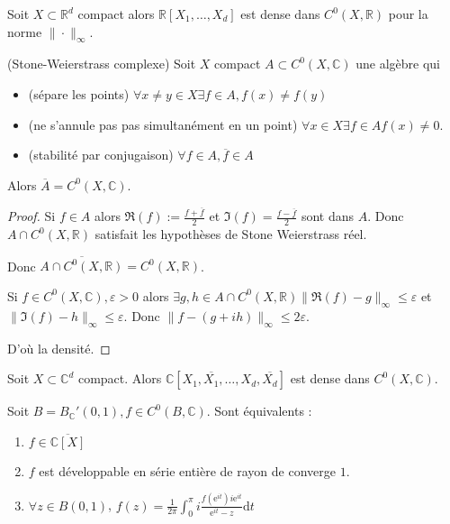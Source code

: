 \begin{corollaire}
	Soit $X\subset \mathbb{R}^d $ compact alors $\mathbb{R}[X_1,\ldots,X_d]$ est dense dans $C^0\left(X,\mathbb{R}\right)  $ pour la norme $\|\cdot \|_\infty$.
\end{corollaire}

\begin{corollaire}
	(Stone-Weierstrass complexe)
	Soit $X$ compact $A \subset C^0\left(X,\mathbb{C} \right)  $ une algèbre qui 
	\begin{itemize}
		\item (sépare les points) $\forall x \neq y \in X \exists f \in A, f(x) \neq f(y)$
		\item (ne s'annule pas pas simultanément en un point) $\forall x \in X \exists f \in A f\left( x \right) \neq 0$.
		\item (stabilité par conjugaison) $\forall f \in A, \overline{f} \in A $
	\end{itemize}
	Alors $\overline{A} = C^0\left(X,\mathbb{C} \right)  $.
\end{corollaire}

\begin{proof}
	Si $f \in A$ alors $\Re\left( f \right) := \frac{f+\overline{f}}{2}$ et $\Im \left( f \right) = \frac{f-\overline{f}}{2}$ sont dans $A$. Donc $A \cap C^0\left(X,\mathbb{R}\right)  $ satisfait les hypothèses de Stone Weierstrass réel. 

	Donc $\overline{A \cap C^0\left(X,\mathbb{R}\right)  } = C^0\left(X,\mathbb{R}\right)  $.

	Si $f \in C^0\left(X,\mathbb{C} \right), \varepsilon>0 $ alors $\exists  g,h \in A \cap  C^0\left(X,\mathbb{R}\right) \| \Re\left( f \right) -g\|_\infty\le \varepsilon $ et $\| \Im\left( f \right) - h\|_{\infty}\le \varepsilon$. Donc $\|f - (g+ih)\|_\infty\le 2 \varepsilon.$

	D'où la densité.
\end{proof}

\begin{corollaire}
	Soit $X \subset \mathbb{C} ^d$ compact.
	Alors $\mathbb{C} [X_1, \overline{X_1},\ldots, X_d, \overline{X_d}]$ est dense dans $C^0\left(X,\mathbb{C} \right)  $.
\end{corollaire}
\begin{remarque}
	Soit $B = B_{\mathbb{C} }'\left( 0,1 \right), f \in C^0\left(B,\mathbb{C} \right)  $.
	Sont équivalents : 
	\begin{enumerate}
		\item $f \in \overline{\mathbb{C} [X]}$
		\item $f$ est développable en série entière de rayon de converge $1$.
		\item $\forall z \in B\left( 0,1 \right) $, $f\left( z \right) = \frac{1}{2 \pi}\int_{0}^{\pi} i\frac{f\left( \text{e}^{it} \right)  i\text{e}^{it}}{\text{e}^{it} -z} \mathrm{d} t$
	\end{enumerate}
\end{remarque}

